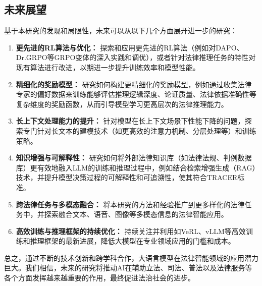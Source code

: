 \documentclass{article}
\begin{document}
\subsection{未来展望}
基于本研究的发现和局限性，未来可以从以下几个方面展开进一步的研究：
\begin{enumerate}
    \item \textbf{更先进的RL算法与优化：} 探索和应用更先进的RL算法（例如对DAPO、Dr.GRPO等GRPO变体的深入实践和调优），或者针对法律推理任务的特性对现有算法进行改进，以期进一步提升训练效率和模型性能。
    \item \textbf{精细化的奖励模型：} 研究如何构建更精细化的奖励模型，例如通过收集法律专家的偏好数据来训练能够评估推理逻辑深度、论证质量、法律依据准确性等复杂维度的奖励函数，从而引导模型学习更高层次的法律推理能力。
    \item \textbf{长上下文处理能力的提升：} 针对模型在长上下文场景下性能下降的问题，探索专门针对长文本的建模技术（如更高效的注意力机制、分层处理等）和训练策略。
    \item \textbf{知识增强与可解释性：} 研究如何将外部法律知识库（如法律法规、判例数据库）更有效地融入LLM的训练和推理过程中，例如结合检索增强生成（RAG）技术，并提升模型决策过程的可解释性和可追溯性，使其符合TRACER标准。
    \item \textbf{跨法律任务与多模态融合：} 将本研究的方法和经验推广到更多样化的法律任务中，并探索融合文本、语音、图像等多模态信息的法律智能应用。
    \item \textbf{高效训练与推理框架的持续优化：} 持续关注并利用如VeRL、vLLM等高效训练和推理框架的最新进展，降低大模型在专业领域应用的门槛和成本。
\end{enumerate}
总之，通过不断的技术创新和跨学科合作，大语言模型在法律智能领域的应用潜力巨大。我们相信，未来的研究将推动AI在辅助立法、司法、普法以及法律服务等各个方面发挥越来越重要的作用，最终促进法治社会的进步。

\end{document}
